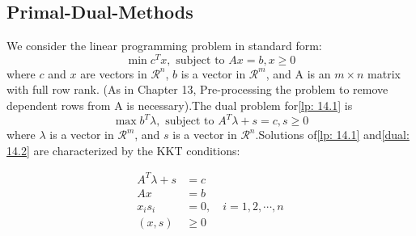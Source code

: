 \subsection{Primal-Dual-Methods} \label{subsec:-primal-dual-methods}
We consider the linear programming problem in standard form:
\[
    \min c^T x, \text{ subject to } Ax = b, x \geq 0 \tag{14.1}\label{lp: 14.1}
\]
where $c$ and $x$ are vectors in $\mathcal{R}^n$, $b$ is a vector in $\mathcal{R}^m$, and A is an
$m\times n$ matrix with full row rank. (As in Chapter 13, Pre-processing the problem to remove dependent rows from A
is necessary).The dual problem for\ref{lp: 14.1} is
\[
    \max b^T \lambda, \text{ subject to } A^T \lambda + s = c, s\geq 0 \tag{14.2}\label{dual: 14.2}
\]
where $\lambda$ is a vector in $\mathcal{R}^m$, and $s$ is a vector in $\mathcal{R}^n$.Solutions of\eqref{lp: 14.1}
and\eqref{dual: 14.2} are characterized by the KKT conditions:

\begin{align}
    A^T\lambda + s &= c \tag{14.3a}\label{KKT: 14.3a}\\
    Ax & = b \tag{14.3b}\label{KKT: 14.3b}\\
    x_i s_i & = 0, \quad i = 1,2,\cdots, n \tag{14.3c} \label{KKT: 14.3c}\\
    (x, s) & \geq 0 \tag{14.3d}\label{KKT: 14.3d}
\end{align}

